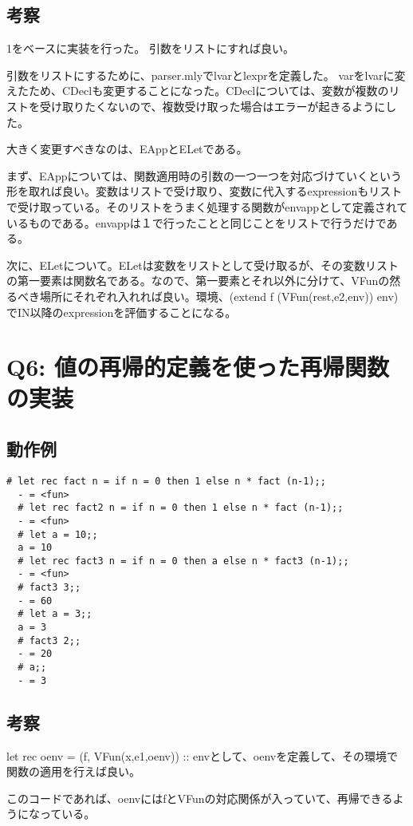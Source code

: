 \documentclass[uplatex,12pt]{jsarticle}
\begin{document}
\subsection{考察}
1をベースに実装を行った。
引数をリストにすれば良い。

引数をリストにするために、parser.mlyでlvarとlexprを定義した。
varをlvarに変えたため、CDeclも変更することになった。CDeclについては、変数が複数のリストを受け取りたくないので、複数受け取った場合はエラーが起きるようにした。

大きく変更すべきなのは、EAppとELetである。

まず、EAppについては、関数適用時の引数の一つ一つを対応づけていくという形を取れば良い。変数はリストで受け取り、変数に代入するexpressionもリストで受け取っている。そのリストをうまく処理する関数がenvappとして定義されているものである。envappは１で行ったことと同じことをリストで行うだけである。

次に、ELetについて。ELetは変数をリストとして受け取るが、その変数リストの第一要素は関数名である。なので、第一要素とそれ以外に分けて、VFunの然るべき場所にそれぞれ入れれば良い。環境、(extend f (VFun(rest,e2,env)) env)でIN以降のexpressionを評価することになる。





\section{Q6: 値の再帰的定義を使った再帰関数の実装}
\subsection{動作例}
\begin{lstlisting}[caption=動作例]
  # let rec fact n = if n = 0 then 1 else n * fact (n-1);;
  - = <fun>
  # let rec fact2 n = if n = 0 then 1 else n * fact (n-1);;
  - = <fun>
  # let a = 10;;
  a = 10
  # let rec fact3 n = if n = 0 then a else n * fact3 (n-1);;
  - = <fun>
  # fact3 3;;
  - = 60
  # let a = 3;;
  a = 3
  # fact3 2;;
  - = 20
  # a;;
  - = 3
\end{lstlisting}

\subsection{考察}
let rec oenv = (f, VFun(x,e1,oenv)) :: envとして、oenvを定義して、その環境で関数の適用を行えば良い。

このコードであれば、oenvにはfとVFunの対応関係が入っていて、再帰できるようになっている。
\end{document}
